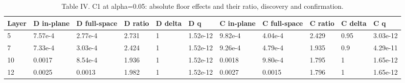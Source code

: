 \begin{table}[t]
\centering
\caption{Table IV. C1 at alpha=0.05: absolute floor effects and their ratio, discovery and confirmation.}
\label{tab:iv}
\begin{tabular}{lllllllllll}
\toprule
Layer & D in-plane & D full-space & D ratio & D delta & D q & C in-plane & C full-space & C ratio & C delta & C q \\
\midrule
5 & 7.57e-4 & 2.77e-4 & 2.731 & 1 & 1.52e-12 & 9.82e-4 & 4.04e-4 & 2.429 & 0.95 & 3.03e-12 \\
7 & 7.33e-4 & 3.03e-4 & 2.424 & 1 & 1.52e-12 & 9.26e-4 & 4.79e-4 & 1.935 & 0.9 & 4.29e-11 \\
10 & 0.0017 & 8.54e-4 & 1.936 & 1 & 1.52e-12 & 0.0018 & 9.80e-4 & 1.795 & 1 & 1.65e-12 \\
12 & 0.0025 & 0.0013 & 1.982 & 1 & 1.52e-12 & 0.0027 & 0.0015 & 1.796 & 1 & 1.65e-12 \\
\bottomrule
\end{tabular}
\end{table}